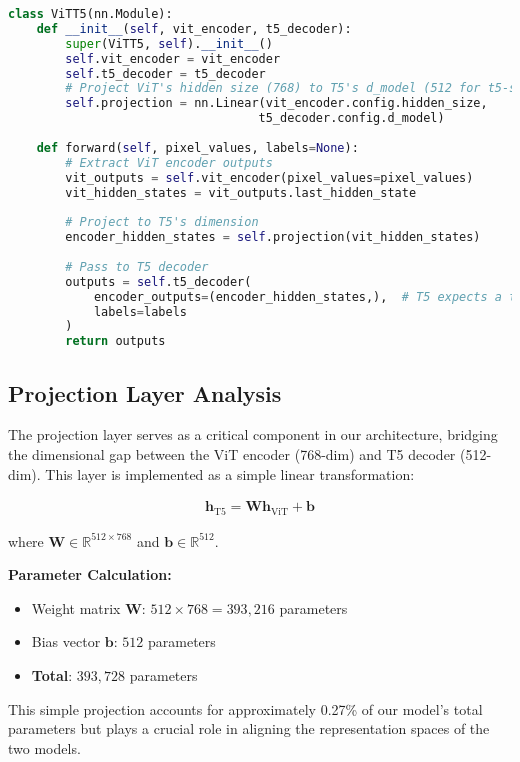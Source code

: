 \documentclass[12pt,a4paper]{report}
\begin{document}
\begin{lstlisting}[language=python, caption=ViT-T5 Model Definition]
class ViTT5(nn.Module):
    def __init__(self, vit_encoder, t5_decoder):
        super(ViTT5, self).__init__()
        self.vit_encoder = vit_encoder
        self.t5_decoder = t5_decoder
        # Project ViT's hidden size (768) to T5's d_model (512 for t5-small)
        self.projection = nn.Linear(vit_encoder.config.hidden_size, 
                                   t5_decoder.config.d_model)
        
    def forward(self, pixel_values, labels=None):
        # Extract ViT encoder outputs
        vit_outputs = self.vit_encoder(pixel_values=pixel_values)
        vit_hidden_states = vit_outputs.last_hidden_state
        
        # Project to T5's dimension
        encoder_hidden_states = self.projection(vit_hidden_states)
        
        # Pass to T5 decoder
        outputs = self.t5_decoder(
            encoder_outputs=(encoder_hidden_states,),  # T5 expects a tuple
            labels=labels
        )
        return outputs
\end{lstlisting}

\subsection{Projection Layer Analysis}
The projection layer serves as a critical component in our architecture, bridging the dimensional gap between the ViT encoder (768-dim) and T5 decoder (512-dim). This layer is implemented as a simple linear transformation:

\begin{align}
\mathbf{h}_{\text{T5}} = \mathbf{W} \mathbf{h}_{\text{ViT}} + \mathbf{b}
\end{align}

where $\mathbf{W} \in \mathbb{R}^{512 \times 768}$ and $\mathbf{b} \in \mathbb{R}^{512}$.

\textbf{Parameter Calculation:}
\begin{itemize}
    \item Weight matrix $\mathbf{W}$: $512 \times 768 = 393,216$ parameters
    \item Bias vector $\mathbf{b}$: $512$ parameters
    \item \textbf{Total}: $393,728$ parameters
\end{itemize}

This simple projection accounts for approximately 0.27\% of our model's total parameters but plays a crucial role in aligning the representation spaces of the two models.
\end{document}

